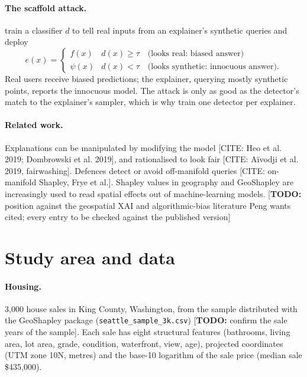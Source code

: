 \documentclass[11pt]{article}
\newcommand{\1}{\mathbf{1}}
\newcommand{\usd}{\ensuremath{\$}}
\newcommand{\todo}[1]{\textcolor{red!70!black}{[\textbf{TODO:} #1]}}
\newcommand{\citeneeded}[1]{\textcolor{blue!60!black}{[CITE: #1]}}
\begin{document}
\paragraph{The scaffold attack.}
\citet{slack2020fooling} train a classifier $d$ to tell real inputs from an explainer's synthetic queries and deploy
\begin{equation}
  e(x) = \begin{cases} f(x) & d(x) \ge \tau \quad\text{(looks real: biased answer)}\\
                       \psi(x) & d(x) < \tau \quad\text{(looks synthetic: innocuous answer).}\end{cases}
  \label{eq:scaffold}
\end{equation}
Real users receive biased predictions; the explainer, querying mostly synthetic points, reports the innocuous model.
The attack is only as good as the detector's match to the explainer's sampler, which is why \citet{slack2020fooling}
train one detector per explainer.

\paragraph{Related work.}
Explanations can be manipulated by modifying the model \citeneeded{Heo et al. 2019; Dombrowski et al. 2019}, and
rationalised to look fair \citeneeded{A\"ivodji et al. 2019, fairwashing}. Defences detect or avoid off-manifold
queries \citep{carmichael2023unfooling} \citeneeded{on-manifold Shapley, Frye et al.}. Shapley values in geography
\citep{li2022shap} and GeoShapley \citep{li2024geoshapley} are increasingly used to read spatial effects out of
machine-learning models. \todo{position against the geospatial XAI and algorithmic-bias literature Peng wants cited;
every entry to be checked against the published version}

\section{Study area and data}

\paragraph{Housing.} 3,000 house sales in King County, Washington, from the sample distributed with the GeoShapley
package (\texttt{seattle\_sample\_3k.csv}) \todo{confirm the sale years of the sample}. Each sale has eight structural
features (bathrooms, living area, lot area, grade, condition, waterfront, view, age), projected coordinates (UTM zone
10N, metres) and the base-10 logarithm of the sale price (median sale \usd435{,}000).
\end{document}
